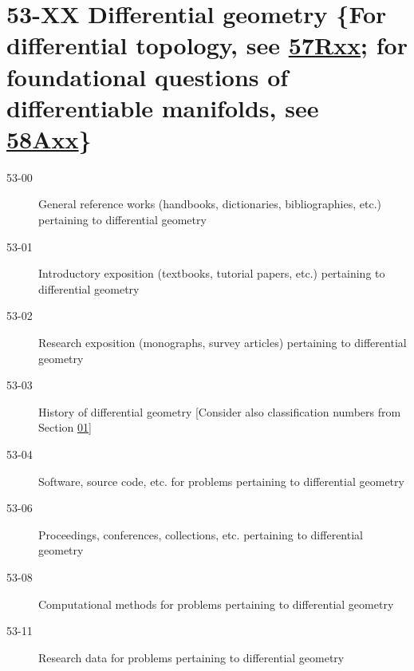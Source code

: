 \documentclass[letterpaper]{article}
\begin{document}
\section*{53-XX Differential geometry \{For differential topology, see \hyperref[57Rxx]{57Rxx}; for foundational questions of differentiable manifolds, see \hyperref[58Axx]{58Axx}\} }\label{53-XX}
\begin{description}
\item [53-00]\label{53-00} General reference works (handbooks, dictionaries, bibliographies, etc.) pertaining to differential geometry
\item [53-01]\label{53-01} Introductory exposition (textbooks, tutorial papers, etc.) pertaining to differential geometry
\item [53-02]\label{53-02} Research exposition (monographs, survey articles) pertaining to differential geometry
\item [53-03]\label{53-03} History of differential geometry [Consider also classification numbers from Section \hyperref[01-XX]{01}]
\item [53-04]\label{53-04} Software, source code, etc. for problems pertaining to differential geometry
\item [53-06]\label{53-06} Proceedings, conferences, collections, etc. pertaining to differential geometry
\item [53-08]\label{53-08} Computational methods for problems pertaining to differential geometry
\item [53-11]\label{53-11} Research data for problems pertaining to differential geometry
\end{description}
\end{document}

